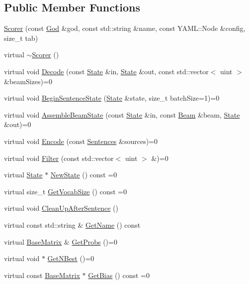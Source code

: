 \subsection*{Public Member Functions}
\begin{DoxyCompactItemize}
\item 
\hyperlink{classamunmt_1_1Scorer_adb6cfebdf0b6f597d58033a81f96e12b}{Scorer} (const \hyperlink{classamunmt_1_1God}{God} \&god, const std\+::string \&name, const Y\+A\+M\+L\+::\+Node \&config, size\+\_\+t tab)
\item 
virtual \hyperlink{classamunmt_1_1Scorer_ad6c6ab62efe12e34ff53dcce9ea3aadc}{$\sim$\+Scorer} ()
\item 
virtual void \hyperlink{classamunmt_1_1Scorer_a88b745f94adaf68095fc5a46874b06fa}{Decode} (const \hyperlink{classamunmt_1_1State}{State} \&in, \hyperlink{classamunmt_1_1State}{State} \&out, const std\+::vector$<$ uint $>$ \&beam\+Sizes)=0
\item 
virtual void \hyperlink{classamunmt_1_1Scorer_a9382a0c256f2475c6bba73854598278d}{Begin\+Sentence\+State} (\hyperlink{classamunmt_1_1State}{State} \&state, size\+\_\+t batch\+Size=1)=0
\item 
virtual void \hyperlink{classamunmt_1_1Scorer_a0abbbc1cd9459db14528acc5877a447b}{Assemble\+Beam\+State} (const \hyperlink{classamunmt_1_1State}{State} \&in, const \hyperlink{namespaceamunmt_a534a3a9a1d99c01a5adf05e700a26012}{Beam} \&beam, \hyperlink{classamunmt_1_1State}{State} \&out)=0
\item 
virtual void \hyperlink{classamunmt_1_1Scorer_aa994ffba9d0e3a6db1adff566a8f3d9b}{Encode} (const \hyperlink{classamunmt_1_1Sentences}{Sentences} \&sources)=0
\item 
virtual void \hyperlink{classamunmt_1_1Scorer_a70b9b4e8c0841db60a97134568e19bb0}{Filter} (const std\+::vector$<$ uint $>$ \&)=0
\item 
virtual \hyperlink{classamunmt_1_1State}{State} $\ast$ \hyperlink{classamunmt_1_1Scorer_a519af19de323970484c7f0eeb8c91428}{New\+State} () const =0
\item 
virtual size\+\_\+t \hyperlink{classamunmt_1_1Scorer_a2c05a34baf59b86a116553c3928f9282}{Get\+Vocab\+Size} () const =0
\item 
virtual void \hyperlink{classamunmt_1_1Scorer_ae2b91e31d6170a5d836ef41acb54cb92}{Clean\+Up\+After\+Sentence} ()
\item 
virtual const std\+::string \& \hyperlink{classamunmt_1_1Scorer_a8fdd81726003c3af514bcc6c47d6653b}{Get\+Name} () const 
\item 
virtual \hyperlink{classamunmt_1_1BaseMatrix}{Base\+Matrix} \& \hyperlink{classamunmt_1_1Scorer_a3d1fff5b4712cda5f1e89049ab401e7d}{Get\+Probs} ()=0
\item 
virtual void $\ast$ \hyperlink{classamunmt_1_1Scorer_a3493e68fa3a10f815fe6e6a7595586ac}{Get\+N\+Best} ()=0
\item 
virtual const \hyperlink{classamunmt_1_1BaseMatrix}{Base\+Matrix} $\ast$ \hyperlink{classamunmt_1_1Scorer_a7e210d41ecf3f65bd4d1fb0ce0f4df7d}{Get\+Bias} () const =0
\end{DoxyCompactItemize}

